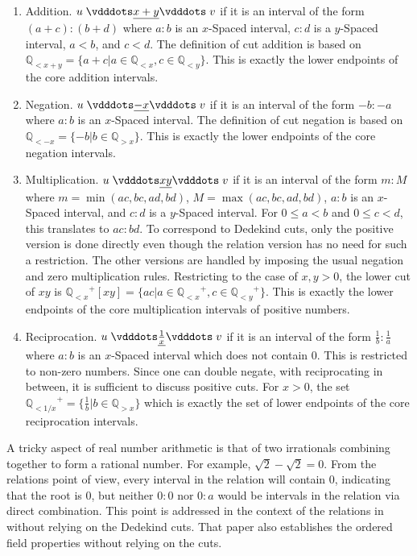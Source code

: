 \documentclass[12pt]{article}
\newcommand{\qcut}[2][x]{\ensuremath{\mathbb{Q}_{#2 #1}}}
\newcommand{\qlt}[1][x]{\qcut[#1]{<}}
\newcommand{\qgt}[1][x]{\qcut[#1]{>}}
\begin{document}
\begin{enumerate}
    \item Addition. $u \xrel[x+y] v$ if it is an interval of the form $(a+c):(b+d)$ where $a:b$ is an $x$-Spaced interval, $c:d$ is a $y$-Spaced interval, $a < b$, and $c < d$. The definition of cut addition is based on $\qlt[x+y] = \{a + c | a \in \qlt, c \in \qlt[y]\} $. This is exactly the lower endpoints of the core addition intervals. 
    \item Negation. $u \xrel[-x] v$ if it is an interval of the form $-b:-a$ where $a:b$ is an $x$-Spaced interval. The definition of cut negation is based on $\qlt[-x] = \{-b | b \in \qgt\}$. This is exactly the lower endpoints of the core negation intervals. 
    \item Multiplication. $u \xrel[xy] v$  if it is an interval of the form $m:M$ where $m = \min(ac, bc, ad, bd)$, $M = \max(ac, bc, ad, bd)$, $a:b$ is an $x$-Spaced interval, and $c:d$ is a $y$-Spaced interval. For $0 \leq a < b$ and $0 \leq c < d$, this translates to $ac:bd$. To correspond to Dedekind cuts, only the positive version is done directly even though the relation version has no need for such a restriction. The other versions are handled by imposing the usual negation and zero multiplication rules. Restricting to the case of $x , y > 0$, the lower cut of $xy$ is $\qlt^+[xy] = \{ac | a \in \qlt^+, c \in \qlt[y]^+ \}$. This is exactly the lower endpoints of the core multiplication intervals of positive numbers. 
    \item Reciprocation. $u \xrel[\frac{1}{x}] v$ if it is an interval of the form $\frac{1}{b}:\frac{1}{a}$ where $a:b$ is an $x$-Spaced interval which does not contain 0. This is restricted to non-zero numbers. Since one can double negate, with reciprocating in between, it is sufficient to discuss positive cuts. For $x> 0$, the set $\qlt[1/x]^+ = \{\frac{1}{b} | b \in \qgt\}$ which is exactly the set of lower endpoints of the core reciprocation intervals. 
\end{enumerate}

A tricky aspect of real number arithmetic is that of two irrationals combining together to form a rational number. For example, $\sqrt{2} - \sqrt{2} = 0$. From the relations point of view, every interval in the relation will contain $0$, indicating that the root is $0$, but neither $0:0$ nor $0:a$ would be intervals in the relation via direct combination. This point is addressed in the context of the relations in \cite{taylor23main} without relying on the Dedekind cuts. That paper also establishes the ordered field properties without relying on the cuts. 
\end{document}
